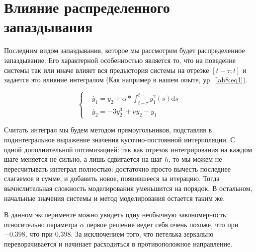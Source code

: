 \chapter{Влияние распределенного запаздывания}\label{lab8}

Последним видом запаздывания, которое мы рассмотрим будет
распределенное запаздывание. Его характерной особенностью является то, что
на поведение системы так или иначе влияет вся предыстория
системы на отрезке $[t-\tau;t]$ и задается это влияние интегралом
(Как например в нашем опыте, ур. \eqref{lab8:eq1}).

\begin{equation}\label{lab8:eq1}
  \begin{cases}
      &\dot{y_1} = y_2 + \alpha * \int_{t-\tau}^t y_1^2(s)\mathrm{d}s\\
      &\dot{y_2} = -3y_2^3\ + \nu y_2 - y_1
  \end{cases}
\end{equation}

Считать интеграл мы будем методом прямоугольников, подставляя
в подинтегральное выражение значения кусочно-постоянной интерполяции.
С одной дополнительной оптимизацией: так как отрезок интегрирования
на каждом шаге меняется не сильно, а лишь сдвигается на шаг
$h$, то мы можем не пересчитывать интеграл полностью:
достаточно просто вычесть последнее слагаемое в сумме, и
добавить новое, появившееся за итерацию. Тогда вычислительная
сложность моделирования уменьшится на порядок. В остальном,
начальные значения системы и метод моделирования остается
таким же.

\clearpage
{}

В данном эксперименте можно увидеть одну необычную закономерность:
относительно параметра $\alpha$ первое решение ведет себя
очень похоже, что при $-0.398$, что при $0.398$. За исключением того,
что петелька зеркально переворачивается и начинает расходиться в
противоположное направление.

